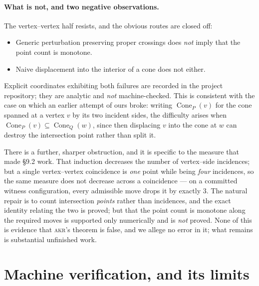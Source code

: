 \documentclass[11pt,a4paper]{article}
\theoremstyle{plain}
\theoremstyle{definition}
\theoremstyle{remark}
\newcommand{\Cone}{\operatorname{Cone}}
\begin{document}
\paragraph{What is not, and two negative observations.} The vertex--vertex half
resists, and the obvious routes are closed off:

\begin{itemize}[leftmargin=*]
  \item Generic perturbation preserving proper crossings does \emph{not} imply
    that the point count is monotone.
  \item Naive displacement into the interior of a cone does not either.
\end{itemize}

Explicit coordinates exhibiting both failures are recorded in the project
repository; they are analytic and \emph{not} machine-checked. This is consistent with the case on which an earlier attempt of ours broke:
writing $\Cone_P(v)$ for the cone spanned at a vertex $v$ by its two incident
sides, the difficulty arises when $\Cone_P(v)\subseteq\Cone_Q(w)$, since then
displacing $v$ into the cone at $w$ can destroy the intersection point rather
than split it.

There is a further, sharper obstruction, and it is specific to the measure that
made \S9.2 work. That induction decreases the number of vertex--side
incidences; but a single vertex--vertex coincidence is \emph{one} point while
being \emph{four} incidences, so the same measure does not decrease across a
coincidence --- on a committed witness configuration, every admissible move
drops it by exactly $3$. The natural repair is to count intersection
\emph{points} rather than incidences, and the exact identity relating the two
is proved; but that the point count is monotone along the required moves is
supported only numerically and is \emph{not} proved. None of this is evidence
that \textsc{akr}'s theorem is false, and we allege no error in it; what remains
is substantial unfinished work.

\section{Machine verification, and its limits}\label{sec:machine}
\end{document}

